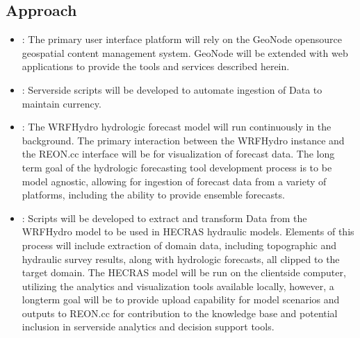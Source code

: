 \documentclass[letterpaper,12pt,english]{book}
\begin{document}
\subsection{Approach}
\label{\detokenize{requirements/approach/index:approach}}\label{\detokenize{requirements/approach/index::doc}}\begin{itemize}
\item {} 
\sphinxAtStartPar
{}: The primary user interface platform will rely on the GeoNode
open\sphinxhyphen{}source geospatial content management system. GeoNode will be extended
with web applications to provide the tools and services described herein.

\item {} 
\sphinxAtStartPar
{}: Server\sphinxhyphen{}side scripts will be developed to automate
ingestion of Data to maintain currency.

\item {} 
\sphinxAtStartPar
{}: The WRF\sphinxhyphen{}Hydro hydrologic forecast model will run continuously in
the background. The primary interaction between the WRF\sphinxhyphen{}Hydro instance and
the REON.cc interface will be for visualization of forecast data. The long
term goal of the hydrologic forecasting tool development process is to be
model agnostic, allowing for ingestion of forecast data from a variety of
platforms, including the ability to provide ensemble forecasts.

\end{itemize}
\begin{itemize}
\item {} 
\sphinxAtStartPar
{}: Scripts will be developed to extract and transform Data from the
WRF\sphinxhyphen{}Hydro model to be used in HEC\sphinxhyphen{}RAS hydraulic models. Elements of this
process will include extraction of domain data, including topographic and
hydraulic survey results, along with hydrologic forecasts, all clipped to
the target domain. The HEC\sphinxhyphen{}RAS model will be run on the client\sphinxhyphen{}side
computer, utilizing the analytics and visualization tools available locally,
however, a long\sphinxhyphen{}term goal will be to provide up\sphinxhyphen{}load capability for model
scenarios and outputs to REON.cc for contribution to the knowledge base and
potential inclusion in server\sphinxhyphen{}side analytics and decision support tools.

\end{itemize}
\end{document}
